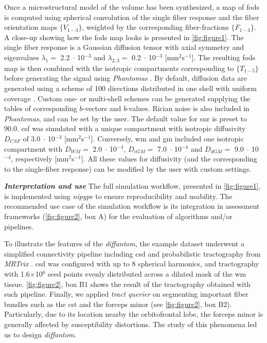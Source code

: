\documentclass[english]{frontiers/frontiersSCNS} %
\newcommand{\e}[1]{\ensuremath{\;\cdot\,}10\ensuremath{^{#1}}}
\begin{document}
Once a microstructural model of the volume has been synthesized, a map of \glspl{fod} is computed using spherical
  convolution of the single fiber response and the fiber orientation maps $\{V_{1\,\cdots\,3}\}$, weighted by the
  corresponding fiber-fractions $\{F_{1\,\cdots\,3}\}$.
A close-up showing how the \glspl{fod} map looks is presented in \autoref{fig:figure1}.
The single fiber response is a Gaussian diffusion tensor with axial symmetry and eigenvalues $\lambda_1=$ 2.2\e{-3}
  and $\lambda_{2,3}=$ 0.2\e{-3} [mm$^2$s$^{-1}$].
The resulting \glspl{fod} map is then combined with the isotropic compartments corresponding to $\{T_{1\,\cdots\,5}\}$
  before generating the signal using \emph{Phantomas} \citep{caruyer_phantomas_2014}.
By default, diffusion data are generated using a scheme of 100 directions distributed in one shell with uniform
  coverage \citep{caruyer_design_2013}.
Custom one- or multi-shell schemes can be generated supplying the tables of corresponding $b$-vectors and $b$-values.
Rician noise is also included in \emph{Phantomas}, and can be set by the user.
The default value for \gls*{snr} is preset to 90.0.
\Gls*{csf} was simulated with a unique compartment with isotropic diffusivity $D_{CSF}$ of 3.0\e{-3} [mm$^2$s$^{-1}$].
Conversely, \Gls*{wm} and \gls*{gm} included one isotropic compartment with $D_{WM} =$ 2.0\e{-4}, $D_{cGM} =$ 7.0\e{-4}
  and $D_{dGM} =$ 9.0\e{-4}, respectively [mm$^2$s$^{-1}$].
All these values for diffusivity (and the corresponding to the single-fiber response) can be modified by the user with
  custom settings.


\noindent\textbf{\textit{Interpretation and use\textcolon}}
The full simulation workflow, presented in \autoref{fig:figure1}, is implemented using
  \emph{nipype} \citep{gorgolewski_nipype_2011} to ensure reproducibility and usability.
The recommended use case of the simulation workflow is its integration in assessment frameworks
  (\autoref{fig:figure2}, box A) for the evaluation of algorithms and/or pipelines.


To illustrate the features of the \emph{diffantom}, the example dataset underwent a simplified
  connectivity pipeline including \gls*{csd} and probabilistic tractography from
  \emph{MRTrix} \citep{tournier_mrtrix_2012}.
\Gls*{csd} was configured with up to 8 spherical harmonics, and tractography with 1.6$\times$10$^\text{6}$
  seed points evenly distributed across a dilated mask of the \gls*{wm} tissue.
\autoref{fig:figure2}, box B1 shows the result of the tractography obtained with such pipeline.
Finally, we applied \emph{tract querier} \citep{wassermann_on_2013} on segmenting important fiber bundles such
  as the \gls*{cst} and the forceps minor (see \autoref{fig:figure2}, box B2).
Particularly, due to its location nearby the orbitofrontal lobe, the forceps minor is generally affected by
  susceptibility distortions.
The study of this phenomena \citep{esteban_simulationbased_2014} led us to design \emph{diffantom}.
\end{document}
